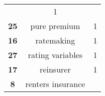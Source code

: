 \documentclass[]{book}
\theoremstyle{definition}
\theoremstyle{definition}
\theoremstyle{definition}
\theoremstyle{remark}
\begin{document}
\begin{longtable}[]{@{}ccc@{}}
\begin{minipage}[t]{0.42\columnwidth}
\end{minipage} & \begin{minipage}[t]{0.29\columnwidth}\centering\strut
1\strut
\end{minipage}\tabularnewline
\begin{minipage}[t]{0.11\columnwidth}\centering\strut
\textbf{25}\strut
\end{minipage} & \begin{minipage}[t]{0.42\columnwidth}\centering\strut
pure premium\strut
\end{minipage} & \begin{minipage}[t]{0.29\columnwidth}\centering\strut
1\strut
\end{minipage}\tabularnewline
\begin{minipage}[t]{0.11\columnwidth}\centering\strut
\textbf{16}\strut
\end{minipage} & \begin{minipage}[t]{0.42\columnwidth}\centering\strut
ratemaking\strut
\end{minipage} & \begin{minipage}[t]{0.29\columnwidth}\centering\strut
1\strut
\end{minipage}\tabularnewline
\begin{minipage}[t]{0.11\columnwidth}\centering\strut
\textbf{27}\strut
\end{minipage} & \begin{minipage}[t]{0.42\columnwidth}\centering\strut
rating variables\strut
\end{minipage} & \begin{minipage}[t]{0.29\columnwidth}\centering\strut
1\strut
\end{minipage}\tabularnewline
\begin{minipage}[t]{0.11\columnwidth}\centering\strut
\textbf{17}\strut
\end{minipage} & \begin{minipage}[t]{0.42\columnwidth}\centering\strut
reinsurer\strut
\end{minipage} & \begin{minipage}[t]{0.29\columnwidth}\centering\strut
1\strut
\end{minipage}\tabularnewline
\begin{minipage}[t]{0.11\columnwidth}\centering\strut
\textbf{8}\strut
\end{minipage} & \begin{minipage}[t]{0.42\columnwidth}\centering\strut
renters insurance\strut
\end{minipage} & \begin{minipage}[t]{0.29\columnwidth}\centering\strut

\end{minipage}
\end{longtable}
\end{document}
